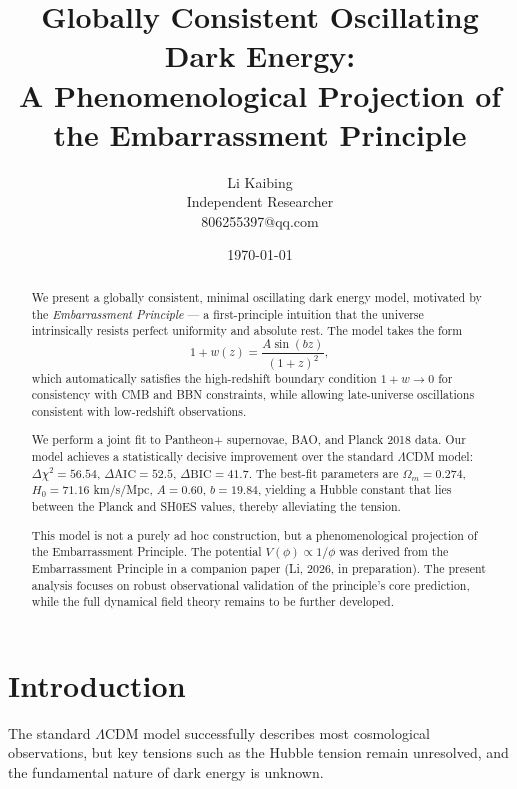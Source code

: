 \documentclass[10pt,twocolumn]{article}
\begin{document}
\title{
Globally Consistent Oscillating Dark Energy: \\
A Phenomenological Projection of the Embarrassment Principle
}

\author{Li Kaibing \\
Independent Researcher \\
806255397@qq.com}

\date{\today}

\maketitle

\begin{abstract}
We present a globally consistent, minimal oscillating dark energy model,
motivated by the \emph{Embarrassment Principle} — a first-principle intuition
that the universe intrinsically resists perfect uniformity and absolute rest.
The model takes the form
\[
1+w(z) = \frac{A\sin(bz)}{(1+z)^2},
\]
which automatically satisfies the high-redshift boundary condition $1+w\to0$
for consistency with CMB and BBN constraints, while allowing
late-universe oscillations consistent with low-redshift observations.

We perform a joint fit to Pantheon+ supernovae, BAO, and Planck 2018 data.
Our model achieves a statistically decisive improvement over the standard
$\Lambda$CDM model: $\Delta\chi^2=56.54$, $\Delta\mathrm{AIC}=52.5$,
$\Delta\mathrm{BIC}=41.7$. The best-fit parameters are
$\Omega_m=0.274$, $H_0=71.16$ km/s/Mpc, $A=0.60$, $b=19.84$,
yielding a Hubble constant that lies between the Planck and SH0ES values,
thereby alleviating the tension.

This model is not a purely ad hoc construction,
but a phenomenological projection of the Embarrassment Principle.
The potential $V(\phi)\propto 1/\phi$ was derived from the Embarrassment Principle
in a companion paper (Li, 2026, in preparation).
The present analysis focuses on robust observational validation
of the principle’s core prediction, while the full dynamical field theory
remains to be further developed.
\end{abstract}

\section{Introduction}
The standard $\Lambda$CDM model successfully describes most cosmological
observations, but key tensions such as the Hubble tension remain unresolved,
and the fundamental nature of dark energy is unknown.
\end{document}

